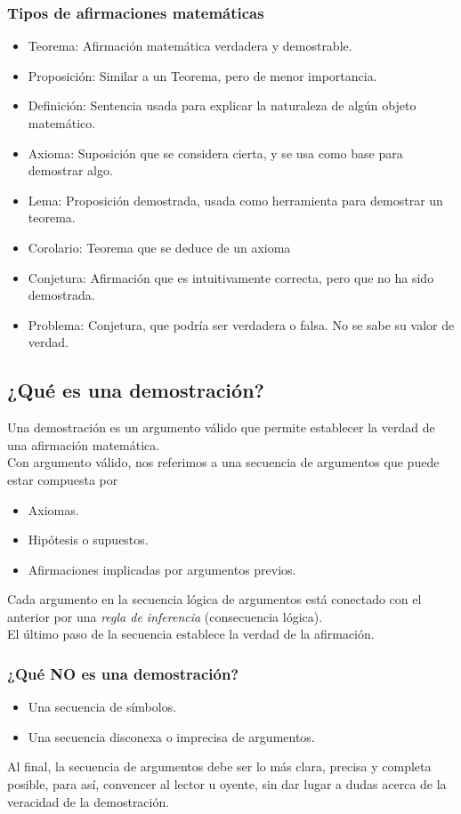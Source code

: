 \documentclass[../main.tex]{subfiles}
\begin{document}
\subsubsection*{Tipos de afirmaciones matemáticas}
\begin{itemize}
    \item Teorema: Afirmación matemática verdadera y demostrable.
    \item Proposición: Similar a un Teorema, pero de menor importancia.
    \item Definición: Sentencia usada para explicar la naturaleza de algún objeto matemático.
    \item Axioma: Suposición que se considera cierta, y se usa como base para demostrar algo.
    \item Lema: Proposición demostrada, usada como herramienta para demostrar un teorema.
    \item Corolario: Teorema que se deduce de un axioma
    \item Conjetura: Afirmación que es intuitivamente correcta, pero que no ha sido demostrada.
    \item Problema: Conjetura, que podría ser verdadera o falsa. No se sabe su valor de verdad.
\end{itemize}

\subsection{¿Qué es una demostración?}
Una demostración es un argumento válido que permite establecer la verdad de una afirmación matemática.\\
Con argumento válido, nos referimos a una secuencia de argumentos que puede estar compuesta por
\begin{itemize}
    \item Axiomas.
    \item Hipótesis o supuestos.
    \item Afirmaciones implicadas por argumentos previos.
\end{itemize}

Cada argumento en la secuencia lógica de argumentos está conectado con el anterior por una \textit{regla de inferencia} (consecuencia lógica).\\
El último paso de la secuencia establece la verdad de la afirmación.

\subsubsection*{¿Qué NO es una demostración?}
\begin{itemize}
    \item Una secuencia de símbolos.
    \item Una secuencia disconexa o imprecisa de argumentos.
\end{itemize}
Al final, la secuencia de argumentos debe ser lo más clara, precisa y completa posible, para así, convencer al lector u oyente, sin dar lugar a dudas acerca de la veracidad de la demostración.
\end{document}
